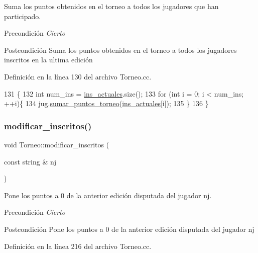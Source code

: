 Suma los puntos obtenidos en el torneo a todos los jugadores que han participado. 

\begin{DoxyPrecond}{Precondición}
{\itshape Cierto} 
\end{DoxyPrecond}
\begin{DoxyPostcond}{Postcondición}
Suma los puntos obtenidos en el torneo a todos los jugadores inscritos en la ultima edición 
\end{DoxyPostcond}


Definición en la línea 130 del archivo Torneo.\+cc.


\begin{DoxyCode}
131 \{
132   \textcolor{keywordtype}{int} num\_ins = \hyperlink{class_torneo_a2293acd2d9d04bdefc603ab4cdce2c5a}{ins\_actuales}.size();
133   \textcolor{keywordflow}{for} (\textcolor{keywordtype}{int} i = 0; i < num\_ins; ++i)\{
134     jug.\hyperlink{class_cjt__jugadores_adaead4375a0c4e8cb02782988423e1d8}{sumar\_puntos\_torneo}(\hyperlink{class_torneo_a2293acd2d9d04bdefc603ab4cdce2c5a}{ins\_actuales}[i]);
135   \}
136 \}
\end{DoxyCode}
\mbox{\label{class_torneo_a89490159cb29ce076f955ebd1ef3a3bf}} 
\subsubsection{\texorpdfstring{modificar\+\_\+inscritos()}{modificar\_inscritos()}}
{\footnotesize\ttfamily void Torneo\+::modificar\+\_\+inscritos (\begin{DoxyParamCaption}\item[{const string \&}]{nj }\end{DoxyParamCaption})}



Pone los puntos a 0 de la anterior edición disputada del jugador nj. 

\begin{DoxyPrecond}{Precondición}
{\itshape Cierto} 
\end{DoxyPrecond}
\begin{DoxyPostcond}{Postcondición}
Pone los puntos a 0 de la anterior edición disputada del jugador nj 
\end{DoxyPostcond}


Definición en la línea 216 del archivo Torneo.\+cc.


